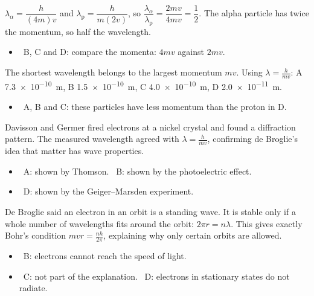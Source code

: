 \documentclass[12pt]{article}
\begin{document}
\begin{practiceanswers}
\begin{practiceans}
  $\lambda_\alpha = \dfrac{h}{(4m)v}$ and $\lambda_\mathrm{p} = \dfrac{h}{m(2v)}$, so
  $\dfrac{\lambda_\alpha}{\lambda_\mathrm{p}} = \dfrac{2mv}{4mv} = \dfrac{1}{2}$.
  The alpha particle has twice the momentum, so half the wavelength.
  \begin{itemize}
    \item \xmark\ B, C and D: compare the momenta: $4mv$ against $2mv$.
  \end{itemize}
\end{practiceans}

\begin{practiceans}
  The shortest wavelength belongs to the largest momentum $mv$. Using $\lambda = \frac{h}{mv}$:
  A \qty{7.3e-10}{m}, B \qty{1.5e-10}{m}, C \qty{4.0e-10}{m}, D \qty{2.0e-11}{m}.
  \begin{itemize}
    \item \xmark\ A, B and C: these particles have less momentum than the proton in D.
  \end{itemize}
\end{practiceans}

\begin{practiceans}
  Davisson and Germer fired electrons at a nickel crystal and found a diffraction pattern. The measured
  wavelength agreed with $\lambda = \frac{h}{mv}$, confirming de Broglie's idea that matter has wave
  properties.
  \begin{itemize}
    \item \xmark\ A: shown by Thomson. \quad \xmark\ B: shown by the photoelectric effect.
    \item \xmark\ D: shown by the Geiger--Marsden experiment.
  \end{itemize}
\end{practiceans}

\begin{practiceans}
  De Broglie said an electron in an orbit is a standing wave. It is stable only if a whole number of
  wavelengths fits around the orbit: $2\pi r = n\lambda$. This gives exactly Bohr's condition
  $mvr = \frac{nh}{2\pi}$, explaining why only certain orbits are allowed.
  \begin{itemize}
    \item \xmark\ B: electrons cannot reach the speed of light.
    \item \xmark\ C: not part of the explanation. \quad \xmark\ D: electrons in stationary states do not
          radiate.
  \end{itemize}
\end{practiceans}


\end{practiceanswers}
\end{document}
